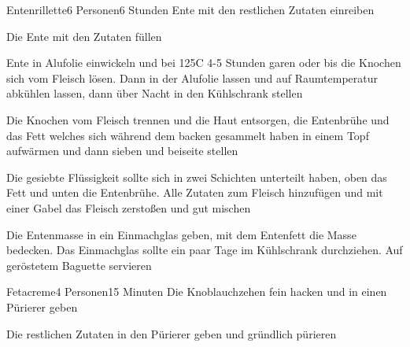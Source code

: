 
\begin{recipe}{Entenrillette}{6 Personen}{6 Stunden}
Ente mit den restlichen Zutaten einreiben

Die Ente mit den Zutaten füllen
 
\ing[]{}{}
Ente in Alufolie einwickeln und bei 125\0C 4-5 Stunden garen oder bis die Knochen sich vom Fleisch lösen.
Dann in der Alufolie lassen und auf Raumtemperatur abkühlen lassen, dann über Nacht in den Kühlschrank stellen

\ing[]{}{}
Die Knochen vom Fleisch trennen und die Haut entsorgen, die Entenbrühe und das Fett welches sich während dem backen gesammelt haben in einem Topf aufwärmen und dann sieben und beiseite stellen

Die gesiebte Flüssigkeit sollte sich in zwei Schichten unterteilt haben, oben das Fett und unten die Entenbrühe.
Alle Zutaten zum Fleisch hinzufügen und mit einer Gabel das Fleisch zerstoßen und gut mischen

Die Entenmasse in ein Einmachglas geben, mit dem Entenfett die Masse bedecken.
Das Einmachglas sollte ein paar Tage im Kühlschrank durchziehen.
Auf geröstetem Baguette servieren
\end{recipe}


\begin{recipe}{Fetacreme}{4 Personen}{15 Minuten}
Die Knoblauchzehen fein hacken und in einen Pürierer geben

Die restlichen Zutaten in den Pürierer geben und gründlich pürieren

\end{recipe} 

